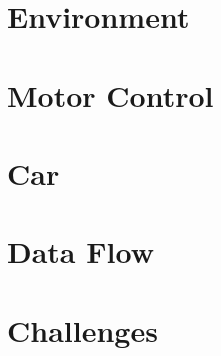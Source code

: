 \section{Environment}

\section{Motor Control}

\section{Car}\label{sec:car-module}

\section{Data Flow}

\section{Challenges}